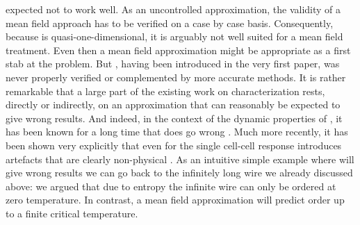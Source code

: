 expected not to work well. As an uncontrolled approximation, the validity of a
mean field approach has to be verified on a case by case basis. Consequently,
because  is quasi-one-dimensional, it is arguably not well suited for
a mean field treatment. Even then a mean field approximation might be
appropriate as a first stab at the problem. But , having been
introduced in the very first  paper, was never properly verified or
complemented by more accurate methods. It is rather remarkable that a large
part of the existing work on  characterization rests, directly or
indirectly, on an approximation that can reasonably be expected to give wrong
results. And indeed, in the context of the dynamic properties of , it
has been known for a long time that  does go wrong
\cite{toth2001role}. Much more recently, it has been shown very explicitly that
even for the single cell-cell response  introduces artefacts that are
clearly non-physical \cite{taucer2012consequences}. As an intuitive simple
example where  will give wrong results we can go back to the
infinitely long wire we already discussed above: we argued that due to entropy
the infinite wire can only be ordered at zero temperature. In contrast, a mean
field approximation will predict order up to a finite critical temperature. 

